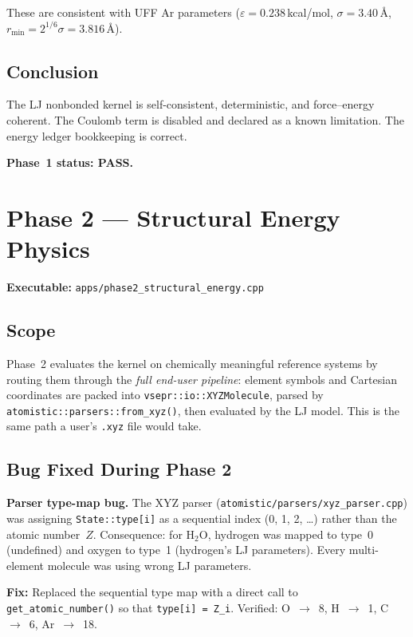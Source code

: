 \documentclass[11pt]{article}
\begin{document}
These are consistent with UFF Ar parameters ($\varepsilon = 0.238$\,kcal/mol,
$\sigma = 3.40$\,\AA, $r_{\min} = 2^{1/6}\sigma = 3.816$\,\AA).

\subsection{Conclusion}

The LJ nonbonded kernel is self-consistent, deterministic, and
force--energy coherent.  The Coulomb term is disabled and declared as a
known limitation.  The energy ledger bookkeeping is correct.

\textbf{Phase~1 status: PASS.}

\section{Phase 2 --- Structural Energy Physics}

\textbf{Executable:} \texttt{apps/phase2\_structural\_energy.cpp}

\subsection{Scope}

Phase~2 evaluates the kernel on chemically meaningful reference systems by
routing them through the \emph{full end-user pipeline}: element symbols and
Cartesian coordinates are packed into \texttt{vsepr::io::XYZMolecule},
parsed by \texttt{atomistic::parsers::from\_xyz()}, then evaluated by the
LJ model.  This is the same path a user's \texttt{.xyz} file would take.

\subsection{Bug Fixed During Phase 2}

\textbf{Parser type-map bug.}
The XYZ parser (\texttt{atomistic/parsers/xyz\_parser.cpp}) was assigning
\texttt{State::type[i]} as a sequential index (0, 1, 2, \ldots) rather
than the atomic number~$Z$.  Consequence: for H$_2$O, hydrogen was mapped
to type~0 (undefined) and oxygen to type~1 (hydrogen's LJ parameters).
Every multi-element molecule was using wrong LJ parameters.

\textbf{Fix:} Replaced the sequential type map with a direct call to
\texttt{get\_atomic\_number()} so that \texttt{type[i] = Z_i}.  Verified:
O~$\to$~8, H~$\to$~1, C~$\to$~6, Ar~$\to$~18.
\end{document}
